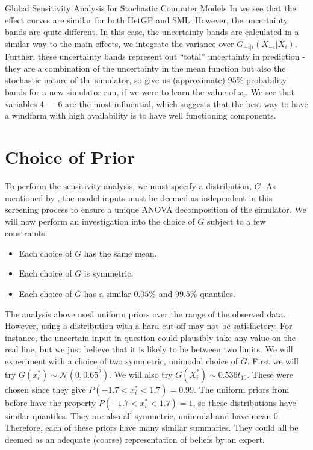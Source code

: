 \begin{chapter}{Global Sensitivity Analysis for Stochastic Computer Models}
In  we see that the effect curves are similar for both HetGP and SML. However, the uncertainty bands are quite different. In this case, the uncertainty bands are calculated in a similar way to the main effects, we integrate the variance over $G_{-i|i}(X_{-i}|X_i)$. Further, these uncertainty bands represent out ``total'' uncertainty in prediction - they are a combination of the uncertainty in the mean function but also the stochastic nature of the simulator, so give us (approximate) $95\%$ probability bands for a new simulator run, if we were to learn the value of $x_i$. We see that variables $4$ --- $6$ are the most influential, which suggests that the best way to have a windfarm with high availability is to have well functioning components.

\section{Choice of Prior}

To perform the sensitivity analysis, we must specify a distribution, $G$. As mentioned by \citet{Marrel2012}, the model inputs must be deemed as independent in this screening process to ensure a unique ANOVA decomposition of the simulator. We will now perform an investigation into the choice of $G$ subject to a few constraints:\\

\begin{itemize}
	\item Each choice of $G$ has the same mean.
	\item Each choice of $G$ is symmetric.
	\item Each choice of $G$ has a similar $0.05\%$ and $99.5\%$ quantiles.
\end{itemize}

The analysis above used uniform priors over the range of the observed data. However, using a distribution with a hard cut-off may not be satisfactory. For instance, the uncertain input in question could plausibly take any value on the real line, but we just believe that it is likely to be between two limits. We will experiment with a choice of two symmetric, unimodal choice of $G$. First we will try $G(x^*_i) \sim \mathcal{N}(0,0.65^2)$. We will also try $G(X^*_i) \sim 0.536t_{10} $. These were chosen since they give $P(-1.7 < x^*_i < 1.7) = 0.99$. The uniform priors from before have the property $P(-1.7 < x^*_i <1.7) = 1$, so these distributions have similar quantiles. They are also all symmetric, unimodal and have mean $0$. Therefore, each of these priors have many similar summaries. They could all be deemed as an adequate (coarse) representation of beliefs by an expert.\\


\end{chapter}
